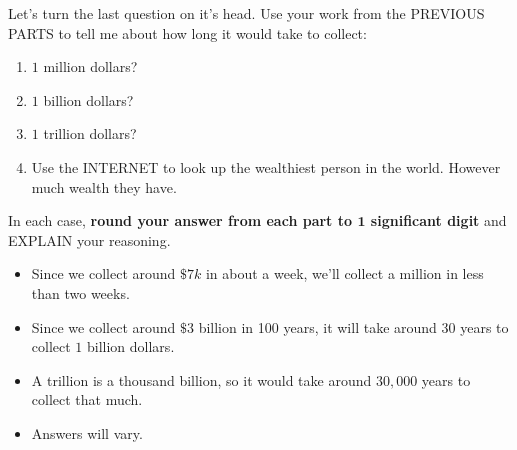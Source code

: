 \documentclass[nooutcomes,noauthor,hints]{ximera}
\begin{document}
\begin{question}
  Let's turn the last question on it's head. Use your work from the
  PREVIOUS PARTS to tell me about how long it would take to collect:
  \begin{enumerate}
  \item $1$ million dollars?
  \item $1$ billion dollars?
  \item $1$ trillion dollars?
  \item Use the INTERNET to look up the wealthiest person in the
    world. However much wealth they have.
  \end{enumerate}
  In each case, \textbf{round your answer from each part to $\boldsymbol{1}$
    significant digit} and EXPLAIN your reasoning.
  \begin{freeResponse}
    \begin{itemize}
      \item Since we collect around $\$7k$ in about a week, we'll
        collect a million in less than two weeks.
      \item Since we collect around $\$3$ billion in 100 years, it
        will take around $30$ years to collect $1$ billion dollars.
      \item A trillion is a thousand billion, so it would take around
        $30,000$ years to collect that much.
      \item Answers will vary.
    \end{itemize}
  \end{freeResponse}
\end{question}
\end{document}
